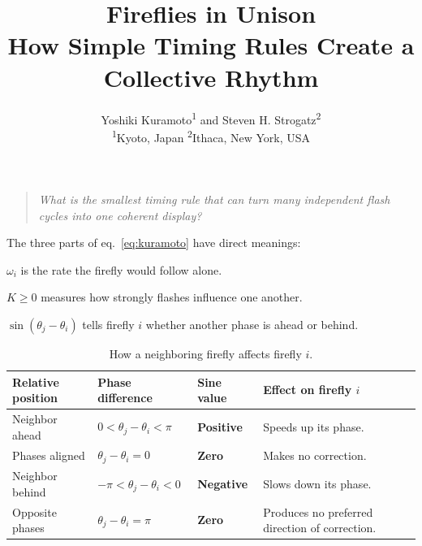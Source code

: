 \begin{quote}\itshape
What is the smallest timing rule that can turn many independent flash cycles into
one coherent display?
\end{quote}



\title{\textbf{\textcolor{titleblue}{Fireflies in Unison}}\\[0.3em]
       \large How Simple Timing Rules Create a Collective Rhythm}
\author{Yoshiki Kuramoto\textsuperscript{1} and Steven H. Strogatz\textsuperscript{2}\\[0.3em]
        {\small \textsuperscript{1}Kyoto, Japan \qquad
         \textsuperscript{2}Ithaca, New York, USA}}
\date{}


\maketitle




The three parts of eq.~\eqref{eq:kuramoto} have direct meanings:
\begin{description}[style=nextline]
    \item[Internal clock] $\omega_i$ is the rate the firefly would follow alone.
    \item[Coupling strength] $K \ge 0$ measures how strongly flashes influence one
          another.
    \item[Timing correction] $\sin(\theta_j - \theta_i)$ tells firefly $i$ whether
          another phase is ahead or behind.
\end{description}




\begin{table}[ht]
    \centering
    \caption{How a neighboring firefly affects firefly $i$.}
    \label{tab:sine}
    \begin{tabular}{l l l >{\raggedright\arraybackslash}p{4.3cm}}
        \toprule
        \textbf{Relative position} & \textbf{Phase difference} &
        \textbf{Sine value} & \textbf{Effect on firefly $i$} \\
        \midrule
        \rowcolor{green!10}
        Neighbor ahead  & $0 < \theta_j-\theta_i < \pi$  &
            \textbf{\textcolor{green!55!black}{Positive}} & Speeds up its phase. \\
        \rowcolor{gray!15}
        Phases aligned  & $\theta_j-\theta_i = 0$        &
            \textbf{Zero} & Makes no correction. \\
        \rowcolor{red!10}
        Neighbor behind & $-\pi < \theta_j-\theta_i < 0$ &
            \textbf{\textcolor{red!70!black}{Negative}} & Slows down its phase. \\
        \rowcolor{gray!15}
        Opposite phases & $\theta_j-\theta_i = \pi$      &
            \textbf{Zero} & Produces no preferred direction of correction. \\
        \bottomrule
    \end{tabular}
\end{table}




